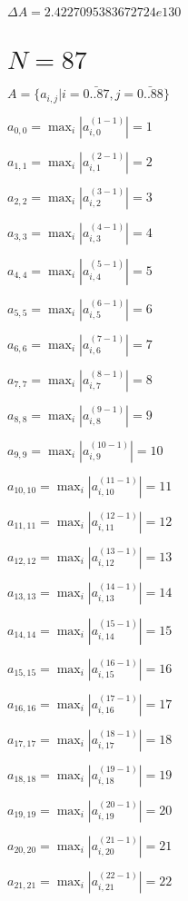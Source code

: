 \documentclass[a4paper,12pt]{article}
\begin{document}
$\Delta A = 2.4227095383672724e130$



\section{ $N = 87$ }
$A = \{ a _{ i, j } | i = \bar { 0..87 }, j = \bar { 0..88 } \}$

$a _{ 0, 0 } =  \max _i |a _{ i, 0 } ^{ (1 - 1) } | = 1$

$a _{ 1, 1 } =  \max _i |a _{ i, 1 } ^{ (2 - 1) } | = 2$

$a _{ 2, 2 } =  \max _i |a _{ i, 2 } ^{ (3 - 1) } | = 3$

$a _{ 3, 3 } =  \max _i |a _{ i, 3 } ^{ (4 - 1) } | = 4$

$a _{ 4, 4 } =  \max _i |a _{ i, 4 } ^{ (5 - 1) } | = 5$

$a _{ 5, 5 } =  \max _i |a _{ i, 5 } ^{ (6 - 1) } | = 6$

$a _{ 6, 6 } =  \max _i |a _{ i, 6 } ^{ (7 - 1) } | = 7$

$a _{ 7, 7 } =  \max _i |a _{ i, 7 } ^{ (8 - 1) } | = 8$

$a _{ 8, 8 } =  \max _i |a _{ i, 8 } ^{ (9 - 1) } | = 9$

$a _{ 9, 9 } =  \max _i |a _{ i, 9 } ^{ (10 - 1) } | = 10$

$a _{ 10, 10 } =  \max _i |a _{ i, 10 } ^{ (11 - 1) } | = 11$

$a _{ 11, 11 } =  \max _i |a _{ i, 11 } ^{ (12 - 1) } | = 12$

$a _{ 12, 12 } =  \max _i |a _{ i, 12 } ^{ (13 - 1) } | = 13$

$a _{ 13, 13 } =  \max _i |a _{ i, 13 } ^{ (14 - 1) } | = 14$

$a _{ 14, 14 } =  \max _i |a _{ i, 14 } ^{ (15 - 1) } | = 15$

$a _{ 15, 15 } =  \max _i |a _{ i, 15 } ^{ (16 - 1) } | = 16$

$a _{ 16, 16 } =  \max _i |a _{ i, 16 } ^{ (17 - 1) } | = 17$

$a _{ 17, 17 } =  \max _i |a _{ i, 17 } ^{ (18 - 1) } | = 18$

$a _{ 18, 18 } =  \max _i |a _{ i, 18 } ^{ (19 - 1) } | = 19$

$a _{ 19, 19 } =  \max _i |a _{ i, 19 } ^{ (20 - 1) } | = 20$

$a _{ 20, 20 } =  \max _i |a _{ i, 20 } ^{ (21 - 1) } | = 21$

$a _{ 21, 21 } =  \max _i |a _{ i, 21 } ^{ (22 - 1) } | = 22$
\end{document}
